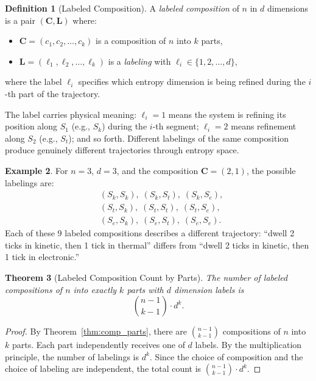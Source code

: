 \documentclass[twocolumn,10pt,a4paper]{article}
\newtheorem{theorem}{Theorem}[section]
\theoremstyle{definition}
\newtheorem{definition}[theorem]{Definition}
\newtheorem{example}[theorem]{Example}
\theoremstyle{remark}
\newcommand{\Sk}{S_k}
\newcommand{\St}{S_t}
\newcommand{\Se}{S_e}
\begin{document}
\begin{definition}[Labeled Composition]
\label{def:labeled_comp}
A \emph{labeled composition} of $n$ in $d$ dimensions is a pair $(\mathbf{C}, \mathbf{L})$ where:
\begin{itemize}
\item $\mathbf{C} = (c_1, c_2, \ldots, c_k)$ is a composition of $n$ into $k$ parts,
\item $\mathbf{L} = (\ell_1, \ell_2, \ldots, \ell_k)$ is a \emph{labeling} with $\ell_i \in \{1, 2, \ldots, d\}$,
\end{itemize}
where the label $\ell_i$ specifies which entropy dimension is being refined during the $i$-th part of the trajectory.
\end{definition}

The label carries physical meaning: $\ell_i = 1$ means the system is refining its position along $S_1$ (e.g., $\Sk$) during the $i$-th segment; $\ell_i = 2$ means refinement along $S_2$ (e.g., $\St$); and so forth. Different labelings of the same composition produce genuinely different trajectories through entropy space.

\begin{example}
For $n = 3$, $d = 3$, and the composition $\mathbf{C} = (2,1)$, the possible labelings are:
\begin{align*}
&(\Sk, \Sk),\; (\Sk, \St),\; (\Sk, \Se), \\
&(\St, \Sk),\; (\St, \St),\; (\St, \Se), \\
&(\Se, \Sk),\; (\Se, \St),\; (\Se, \Se).
\end{align*}
Each of these 9 labeled compositions describes a different trajectory: ``dwell 2 ticks in kinetic, then 1 tick in thermal'' differs from ``dwell 2 ticks in kinetic, then 1 tick in electronic.''
\end{example}

\begin{theorem}[Labeled Composition Count by Parts]
\label{thm:labeled_parts}
The number of labeled compositions of $n$ into exactly $k$ parts with $d$ dimension labels is
\begin{equation}
\binom{n-1}{k-1} \cdot d^k.
\end{equation}
\end{theorem}

\begin{proof}
By Theorem~\ref{thm:comp_parts}, there are $\binom{n-1}{k-1}$ compositions of $n$ into $k$ parts. Each part independently receives one of $d$ labels. By the multiplication principle, the number of labelings is $d^k$. Since the choice of composition and the choice of labeling are independent, the total count is $\binom{n-1}{k-1} \cdot d^k$.
\end{proof}
\end{document}
